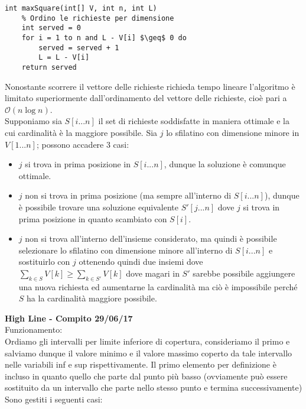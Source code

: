 \documentclass[../cheatSheetAlgoritmi.tex]{subfiles}
\begin{document}
\begin{lstlisting}[caption=Sfilatino alla Nutella]
int maxSquare(int[] V, int n, int L)
	% Ordino le richieste per dimensione
	int served = 0
	for i = 1 to n and L - V[i] $\geq$ 0 do
		served = served + 1
		L = L - V[i]
	return served
\end{lstlisting}
Nonostante scorrere il vettore delle richieste richieda tempo lineare l'algoritmo è limitato superiormente dall'ordinamento del vettore delle richieste, cioè pari a $\mathcal{O}(n \log{n})$.\\
Supponiamo sia $S[i...n]$ il set di richieste soddisfatte in maniera ottimale e la cui cardinalità è la maggiore possibile. Sia $j$ lo sfilatino con dimensione minore in $V[1...n]$; possono accadere 3 casi:
\begin{itemize}
	\item $j$ si trova in prima posizione in $S[i...n]$, dunque la soluzione è comunque ottimale.
	\item $j$ non si trova in prima posizione (ma sempre all'interno di $S[i...n]$), dunque è possibile trovare una soluzione equivalente $S'[j...n]$ dove $j$ si trova in prima posizione in quanto scambiato con $S[i]$.
	\item $j$ non si trova all'interno dell'insieme considerato, ma quindi è possibile selezionare lo sfilatino con dimensione minore all'interno di $S[i...n]$ e sostituirlo con $j$ ottenendo quindi due insiemi dove $\sum_{k \in S} V[k] \geq \sum_{k \in S'} V[k]$ dove magari in $S'$ sarebbe possibile aggiungere una nuova richiesta ed aumentarne la cardinalità ma ciò è impossibile perché $S$ ha la cardinalità maggiore possibile.
\end{itemize}
\textbf{High Line - Compito 29/06/17}\\
Funzionamento: \\
Ordiamo gli intervalli per limite inferiore di copertura, consideriamo il primo e salviamo dunque il valore minimo e il valore massimo coperto da tale intervallo nelle variabili inf e sup rispettivamente. Il primo elemento per definizione è incluso in quanto quello che parte dal punto più basso (ovviamente può essere sostituito da un intervallo che parte nello stesso punto e termina successivamente)\\
Sono gestiti i seguenti casi: 
\end{document}

